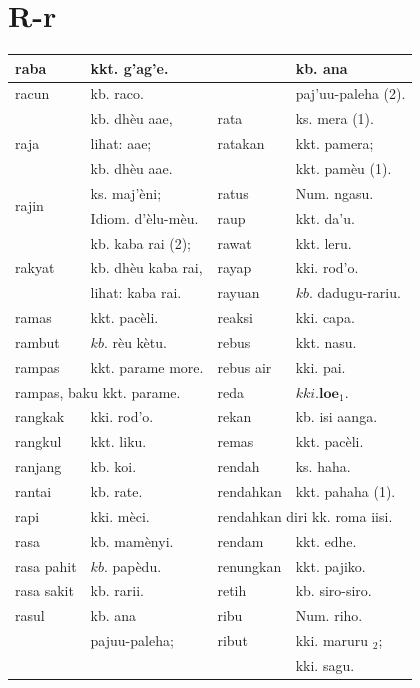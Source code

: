 \documentclass[10pt]{article}
\begin{document}
\section*{R-r}
\begin{center}
\begin{tabular}{|l|l|l|l|}
\hline
raba & kkt. g'ag'e. &  & kb. ana \\
\hline
racun & kb. raco. &  & paj'uu-paleha (2). \\
\hline
\multirow[t]{3}{*}{raja} & kb. dhèu aae, & rata & ks. mera (1). \\
\hline
 & lihat: aae; & ratakan & kkt. pamera; \\
\hline
 & kb. dhèu aae. &  & kkt. pamèu (1). \\
\hline
\multirow[t]{2}{*}{rajin} & ks. maj'èni; & ratus & Num. ngasu. \\
\hline
 & Idiom. d'èlu-mèu. & raup & kkt. da'u. \\
\hline
\multirow[t]{3}{*}{rakyat} & kb. kaba rai (2); & rawat & kkt. leru. \\
\hline
 & kb. dhèu kaba rai, & rayap & kki. rod'o. \\
\hline
 & lihat: kaba rai. & rayuan & \(k b\). dadugu-rariu. \\
\hline
ramas & kkt. pacèli. & reaksi & kki. capa. \\
\hline
rambut & \(k b\). rèu kètu. & rebus & kkt. nasu. \\
\hline
rampas & kkt. parame more. & rebus air & kki. pai. \\
\hline
\multicolumn{2}{|l|}{rampas, baku kkt. parame.} & reda & \(k k i . \mathbf{l o e}_{1}\). \\
\hline
rangkak & kki. rod'o. & rekan & kb. isi aanga. \\
\hline
rangkul & kkt. liku. & remas & kkt. pacèli. \\
\hline
ranjang & kb. koi. & rendah & ks. haha. \\
\hline
rantai & kb. rate. & rendahkan & kkt. pahaha (1). \\
\hline
rapi & kki. mèci. & \multicolumn{2}{|l|}{rendahkan diri kk. roma iisi.} \\
\hline
rasa & kb. mamènyi. & rendam & kkt. edhe. \\
\hline
rasa pahit & \(k b\). papèdu. & renungkan & kkt. pajiko. \\
\hline
rasa sakit & kb. rarii. & retih & kb. siro-siro. \\
\hline
rasul & kb. ana & ribu & Num. riho. \\
\hline
 & pajuu-paleha; & ribut & kki. maruru \({ }_{2}\); \\
\hline
 &  &  & kki. sagu. \\
\hline
\end{tabular}
\end{center}
\end{document}
